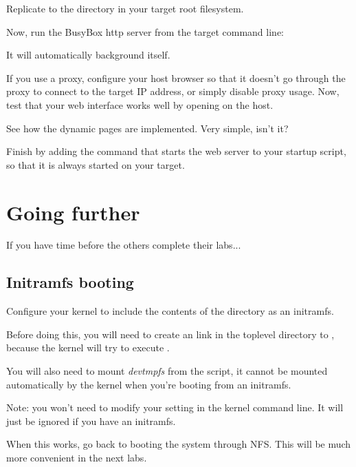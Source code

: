 Replicate  to the  directory in your target
root filesystem.

Now, run the BusyBox http server from the target command line:


It will automatically background itself.

If you use a proxy, configure your host browser so that it doesn't go
through the proxy to connect to the target IP address, or simply
disable proxy usage.  Now, test that your web interface works well by
opening  on the host.

See how the dynamic pages are implemented. Very simple, isn't it?

Finish by adding the command that starts the web server to your
startup script, so that it is always started on your target.

\section{Going further}

If you have time before the others complete their labs...

\subsection{Initramfs booting}

Configure your kernel to include the contents of the 
directory as an initramfs.

Before doing this, you will need to create an  link in the
toplevel directory to , because the kernel will try to
execute .

You will also need to mount {\em devtmpfs} from the  script,
it cannot be mounted automatically by the kernel when you're booting
from an initramfs.

Note: you won't need to modify your  setting in the kernel
command line. It will just be ignored if you have an initramfs.

When this works, go back to booting the system through NFS.
This will be much more convenient in the next labs.

